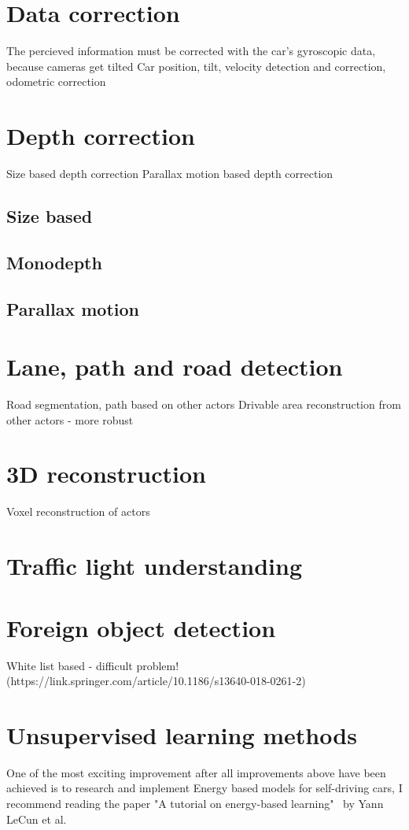 \section{Data correction}


The percieved information must be corrected with the car's gyroscopic data,
because cameras get tilted Car position, tilt, velocity detection and correction,
odometric correction




\section{Depth correction}
Size based depth correction
Parallax motion based depth correction
\subsection{Size based}
\subsection{Monodepth}
\subsection{Parallax motion}
\section{Lane, path and road detection}
Road segmentation, path  based on other actors
Drivable area reconstruction from other actors - more robust


\section{3D reconstruction}
Voxel reconstruction of actors
\section{Traffic light understanding}
\section{Foreign object detection}
White list based - difficult problem! (https://link.springer.com/article/10.1186/s13640-018-0261-2)

\section{Unsupervised learning methods}
One of the most exciting improvement after all improvements above have been
achieved is to research and implement Energy based models for self-driving cars,
I recommend reading the paper "A tutorial on energy-based
learning"~\cite{Lecun98gradient-basedlearning} by Yann LeCun et al.
